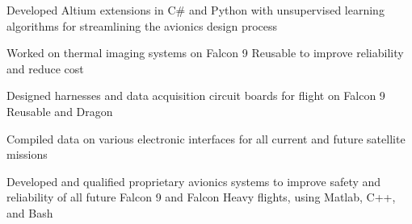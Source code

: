 \documentclass[letterpaper]{article}
\begin{document}
\begin{compactitem}
	\item Developed Altium extensions in C\# and Python with unsupervised learning algorithms for streamlining the avionics design process\\
	\item Worked on thermal imaging systems on Falcon 9 Reusable to improve reliability and reduce cost\\
	\item Designed harnesses and data acquisition circuit boards for flight on Falcon 9 Reusable and Dragon\\
	\item Compiled data on various electronic interfaces for all current and future satellite missions\\
	\item Developed and qualified proprietary avionics systems to improve safety and reliability of all future Falcon 9 and Falcon Heavy flights, using Matlab, C++, and Bash
\end{compactitem}
\end{document}
